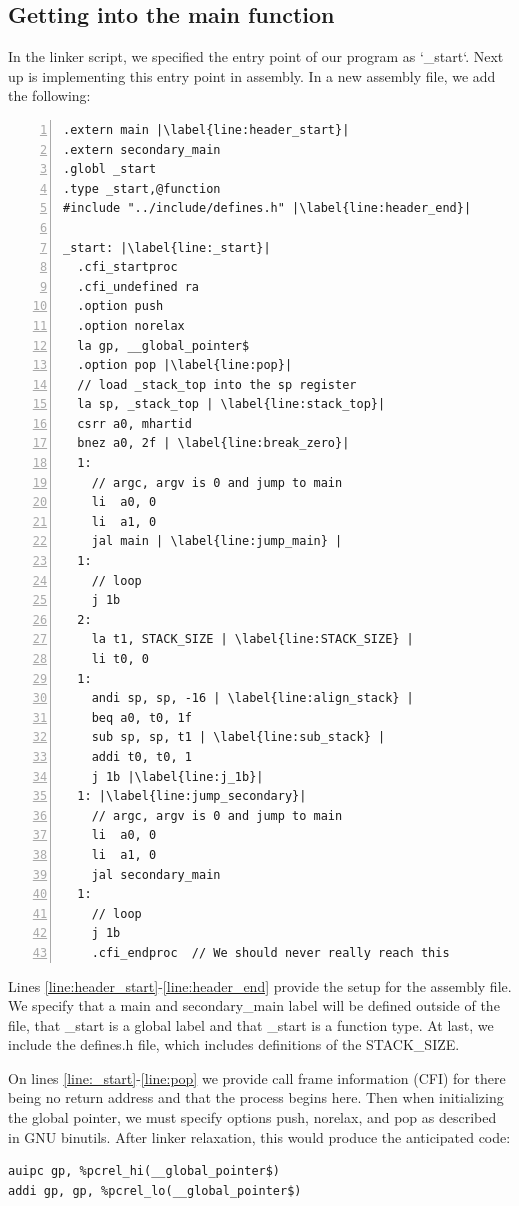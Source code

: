 \subsection{Getting into the main function}\label{sec:get_main}
In the linker script, we specified the entry point of our program as `\_start`.
Next up is implementing this entry point in assembly. In a new assembly file, we
add the following:
\begin{lstlisting}[numbers=left, escapechar=|, caption=Assembly code for getting
to main function.]
.extern main |\label{line:header_start}|
.extern secondary_main
.globl _start
.type _start,@function
#include "../include/defines.h" |\label{line:header_end}|

_start: |\label{line:_start}|
  .cfi_startproc
  .cfi_undefined ra
  .option push
  .option norelax
  la gp, __global_pointer$
  .option pop |\label{line:pop}|
  // load _stack_top into the sp register
  la sp, _stack_top | \label{line:stack_top}|
  csrr a0, mhartid
  bnez a0, 2f | \label{line:break_zero}|
  1:
    // argc, argv is 0 and jump to main
    li  a0, 0
    li  a1, 0
    jal main | \label{line:jump_main} |
  1:
    // loop
    j 1b
  2:
    la t1, STACK_SIZE | \label{line:STACK_SIZE} |
    li t0, 0
  1:
    andi sp, sp, -16 | \label{line:align_stack} |
    beq a0, t0, 1f
    sub sp, sp, t1 | \label{line:sub_stack} |
    addi t0, t0, 1
    j 1b |\label{line:j_1b}|
  1: |\label{line:jump_secondary}|
    // argc, argv is 0 and jump to main
    li  a0, 0
    li  a1, 0
    jal secondary_main
  1:
    // loop
    j 1b
    .cfi_endproc  // We should never really reach this
\end{lstlisting}
Lines \ref{line:header_start}-\ref{line:header_end} provide the setup for the
assembly file. We specify that a main and secondary\_main label will be defined
outside of the file, that \_start is a global label and that \_start is a
function type. At last, we include the defines.h file, which includes
definitions of the STACK\_SIZE.

On lines \ref{line:_start}-\ref{line:pop} we provide call frame information
(CFI) for there being no return address and that the process begins here. Then
when initializing the global pointer, we must specify options push, norelax, and
pop as described in GNU binutils. \cite{GNU_bin} After linker relaxation, this
would produce the anticipated code:
\begin{lstlisting}
auipc gp, %pcrel_hi(__global_pointer$)
addi gp, gp, %pcrel_lo(__global_pointer$)
\end{lstlisting}


